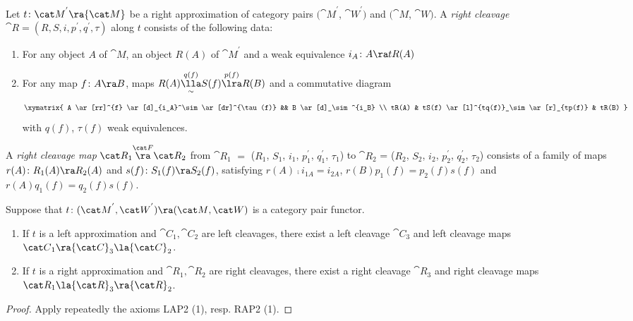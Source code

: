 \begin{defn}
\label{defn:wrightcleavage}
Let $t \colon {\cat M}^{'} \ra {\cat M}$ be a right approximation of category pairs $({\cat M}^{'}$, ${\cat W}^{'})$ and $({\cat M}$, ${\cat W})$. A {\it right cleavage} ${\cat R} = (R, S, i, p^{'}, q^{'}, \tau)$ along $t$ consists of the following data:
\begin{enumerate}
\item
For any object $A$ of ${\cat M}$, an object $R(A)$ of ${\cat M}^{'}$ and a weak equivalence $i_A \colon A \ra tR(A)$
\item
For any map $f \colon A \ra B$, maps $R(A) \underset{\sim}{\overset{q(f)}{\lla}} S(f) \overset{p(f)}{\lra} R(B)$ and a commutative diagram
\[
\xymatrix{
  A \ar[rr]^{f} \ar[d]_{i_A}^\sim \ar[dr]^{\tau(f)} && B \ar[d]_\sim^{i_B}   \\
  tR(A)  & tS(f)  \ar[l]^{tq(f)}_\sim \ar[r]_{tp(f)} & tR(B) 
}
\]
with $q(f)$, $\tau(f)$ weak equivalences.
\end{enumerate}

A {\it right cleavage map} ${\cat R}_1 \overset{\cat F}{\ra} {\cat R}_2$ from ${\cat R}_1$ $=$ ($R_1$, $S_1$, $i_1$, $p^{'}_1$, $q^{'}_1$, $\tau_1$) to ${\cat R}_2$ = ($R_2$, $S_2$, $i_2$, $p^{'}_2$, $q^{'}_2$, $\tau_2$) consists of a family of maps $r(A) \colon R_1(A) \ra R_2(A)$ and $s(f) \colon S_1(f) \ra S_2(f)$, satisfying $r(A) \comp i_{1A} = i_{2A}$, $r(B)p_1(f) = p_2(f)s(f)$ and $r(A)q_1(f) = q_2(f)s(f)$. 
\end{defn}


\begin{lem}
\label{lem:cleavagemap}
Suppose that $t \colon ({\cat M}^{'}, {\cat W}^{'}) \ra ({\cat M}, {\cat W})$ is a category pair functor.
\mbox{}
\begin{enumerate}
\item
If $t$ is a left approximation and ${\cat C}_1, {\cat C}_2$ are left cleavages, there exist a left cleavage ${\cat C}_3$ and left cleavage maps ${\cat C}_1 \ra {\cat C}_3 \la {\cat C}_2$.
\item
If $t$ is a right approximation and ${\cat R}_1, {\cat R}_2$ are right cleavages, there exist a right cleavage ${\cat R}_3$ and right cleavage maps ${\cat R}_1 \la {\cat R}_3 \ra {\cat R}_2$.
\end{enumerate}
\end{lem}

\begin{proof}
Apply repeatedly the axioms LAP2 (1), resp. RAP2 (1).
\end{proof}

